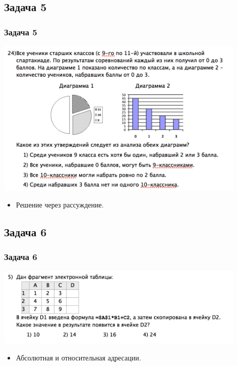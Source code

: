 \documentclass[compress,red]{beamer}
\begin{document}
\subsection{Задача 5}
\begin{frame}[fragile]
  \frametitle{Задача 5}
  \centerline{\includegraphics[width=0.9\textwidth]{images/11.png}}
  \begin{itemize}
      \item Решение через рассуждение.
  \end{itemize}
\end{frame}

\subsection{Задача 6}
\begin{frame}[fragile]
  \frametitle{Задача 6}
  \centerline{\includegraphics[width=0.9\textwidth]{images/12.png}}
  \begin{itemize}
      \item Абсолютная и относительная адресации.
  \end{itemize}
\end{frame}
\end{document}

